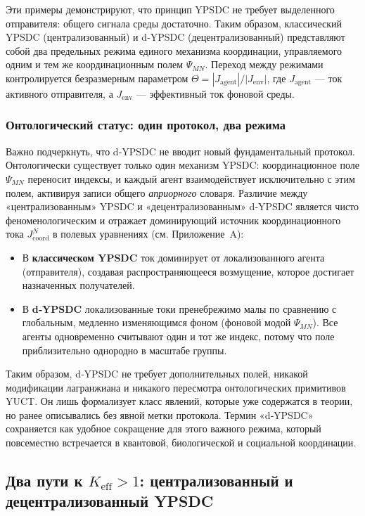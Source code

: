 \documentclass[11pt,a4paper]{article}
\begin{document}
	Эти примеры демонстрируют, что принцип YPSDC не требует выделенного отправителя: общего
	сигнала среды достаточно. Таким образом, классический YPSDC (централизованный) и d‑YPSDC (децентрализованный) представляют собой
	два предельных режима единого механизма координации, управляемого одним и тем же координационным полем
	$\Psi_{MN}$. Переход между режимами контролируется безразмерным параметром
	$\Theta = |J_{\mathrm{agent}}|/|J_{\mathrm{env}}|$, где $J_{\mathrm{agent}}$ — ток активного
	отправителя, а $J_{\mathrm{env}}$ — эффективный ток фоновой среды.
	
	\subsubsection*{Онтологический статус: один протокол, два режима}
	
	Важно подчеркнуть, что d‑YPSDC не вводит новый фундаментальный протокол.  
	Онтологически существует только один механизм YPSDC: координационное поле \(\Psi_{MN}\) переносит 
	индексы, и каждый агент взаимодействует исключительно с этим полем, активируя записи общего 
	\emph{априорного} словаря. Различие между «централизованным» YPSDC и «децентрализованным» 
	d‑YPSDC является чисто феноменологическим и отражает доминирующий источник координационного 
	тока \(J^{N}_{\mathrm{coord}}\) в полевых уравнениях (см. Приложение~A):
	\begin{itemize}[leftmargin=*]
		\item В \textbf{классическом YPSDC} ток доминирует от локализованного агента (отправителя), 
		создавая распространяющееся возмущение, которое достигает назначенных получателей.
		\item В \textbf{d‑YPSDC} локализованные токи пренебрежимо малы по сравнению с глобальным, медленно 
		изменяющимся фоном (фоновой модой \(\Psi_{MN}\)). Все агенты одновременно считывают 
		один и тот же индекс, потому что поле приблизительно однородно в масштабе группы.
	\end{itemize}
	Таким образом, d‑YPSDC не требует дополнительных полей, никакой модификации лагранжиана 
	и никакого пересмотра онтологических примитивов YUCT. Он лишь формализует класс явлений, которые 
	уже содержатся в теории, но ранее описывались без явной метки протокола.  
	Термин «d‑YPSDC» сохраняется как удобное сокращение для этого важного режима, который 
	повсеместно встречается в квантовой, биологической и социальной координации.
	
	\subsection{Два пути к \(K_{\mathrm{eff}} > 1\): централизованный и децентрализованный YPSDC}
	\label{subsec:two-paths}
	
\end{document}
